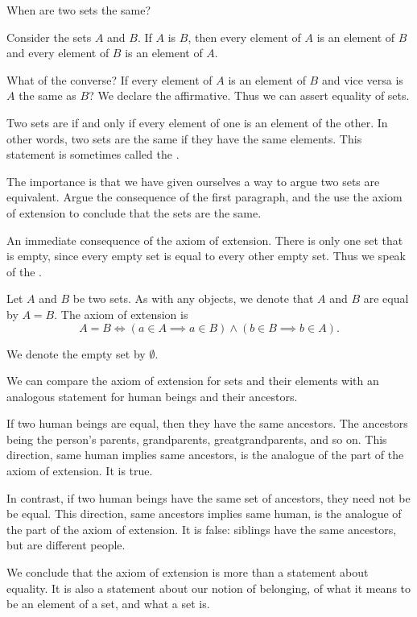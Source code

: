 

When are two
sets the same?


Consider the sets
$A$ and $B$.
If $A$ is $B$,
then every element of
$A$ is an element of
$B$ and every element
of $B$ is an element of
$A$.

What of the converse?
If every element of $A$
is an element of $B$
and vice versa is $A$
the same as $B$?
We declare the affirmative.
Thus we can assert equality
of sets.

Two sets are
if and only
if every element of one
is an element of the other.
In other words, two sets are
the same if they have the same
elements.
This statement
is sometimes called the
.

The importance is that we have
given ourselves a way to argue
two sets are equivalent. Argue
the consequence of the first
paragraph, and the use the
axiom of extension to conclude
that the sets are the same.

An immediate consequence of the axiom
of extension.
There is only one set that
is empty,
since every empty set
is equal to
every other empty set.
Thus we speak of
the .


Let $A$ and $B$ be
two sets.
As with any objects,
we denote that
$A$ and $B$
are equal
by $A = B$.
The axiom of extension is
\[
  A = B \Leftrightarrow (a \in A \implies a \in B) \land (b \in B \implies b \in A).
\]

We denote the empty set
by $\emptyset$.


We can compare the axiom of extension
for sets and their elements with an
analogous statement
for human beings and their ancestors.

If two human beings are equal,
then they have the same ancestors.
The ancestors being the person's parents,
grandparents, greatgrandparents,
and so on.
This direction, same human implies
same ancestors, is the analogue of
the  part of the axiom
of extension.
It is true.

In contrast, if two human beings have
the same set of ancestors, they need not be
be equal.
This direction, same ancestors implies
same human, is the analogue of the
 part of the axiom
of extension.
It is false:
siblings have the same ancestors,
but are different people.

We conclude that the axiom of extension
is more than a statement about equality.
It is also a statement about our notion of
belonging, of what it means
to be an element of a set, and what a set is.

